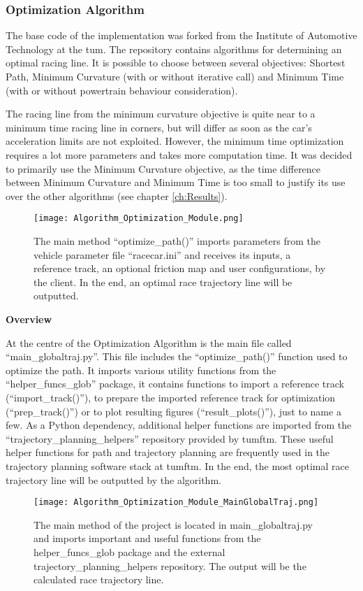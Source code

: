 \subsubsection{Optimization Algorithm} \label{sec:Optimization Algorithm}
The base code of the implementation was forked from the Institute of Automotive Technology at the \acrlong{tum}.
The repository contains algorithms for determining an optimal racing line. It is possible to choose between several objectives: Shortest Path, Minimum Curvature (with or without iterative call) and Minimum Time (with or without powertrain behaviour consideration). \cite{tumftm_optimization_algoritm}

The racing line from the minimum curvature objective is quite near to a minimum time racing line in corners, but will differ as soon as the car's acceleration limits are not exploited. However, the minimum time optimization requires a lot more parameters and takes more computation time. It was decided to primarily use the Minimum Curvature objective, as the time difference between Minimum Curvature and Minimum Time is too small to justify its use over the other algorithms (see chapter \ref{ch:Results}).

\begin{figure}[H]
    \centering
    \texttt{[image: Algorithm\_Optimization\_Module.png]}
    \caption{The main method ``optimize\_path()'' imports parameters from the vehicle parameter file ``racecar.ini'' and receives its inputs, a reference track, an optional friction map and user configurations, by the client. In the end, an optimal race trajectory line will be outputted.}
    \label{fig:Optimization Algorithm Module Overview}
\end{figure}

\textbf{Overview}

At the centre of the Optimization Algorithm is the main file called ``main\_globaltraj.py''. This file includes the ``optimize\_path()'' function used to optimize the path. It imports various utility functions from the ``helper\_funcs\_glob'' package, it contains functions to import a reference track (``import\_track()''), to prepare the imported reference track for optimization (``prep\_track()'') or to plot resulting figures (``result\_plots()''), just to name a few. As a Python dependency, additional helper functions are imported from the ``trajectory\_planning\_helpers'' repository provided by \acrshort{tumftm}. \cite{tumftm_trajectory_planning_helpers}
These useful helper functions for path and trajectory planning are frequently used in the trajectory planning software stack at \acrshort{tumftm}.
In the end, the most optimal race trajectory line will be outputted by the algorithm.
\begin{figure}[H]
    \centering
    \texttt{[image: Algorithm\_Optimization\_Module\_MainGlobalTraj.png]}
    \caption{The main method of the project is located in main\_globaltraj.py and imports important and useful functions from the helper\_funcs\_glob package and the external trajectory\_planning\_helpers repository. The output will be the calculated race trajectory line.}
    \label{fig:Optimization Algorithm Module MainGlobalTraj}
\end{figure}

